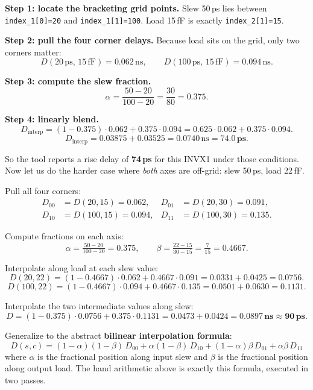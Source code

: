 \textbf{Step 1: locate the bracketing grid points.} Slew 50\,ps lies between \texttt{index\_1[0]=20} and \texttt{index\_1[1]=100}. Load 15\,fF is exactly \texttt{index\_2[1]=15}.

\textbf{Step 2: pull the four corner delays.} Because load sits on the grid, only two corners matter:
\[
D(20\,\text{ps},\,15\,\text{fF}) = 0.062\,\text{ns}, \qquad D(100\,\text{ps},\,15\,\text{fF}) = 0.094\,\text{ns}.
\]

\textbf{Step 3: compute the slew fraction.}
\[
\alpha = \frac{50 - 20}{100 - 20} = \frac{30}{80} = 0.375.
\]

\textbf{Step 4: linearly blend.}
\[
D_{\text{interp}} = (1 - 0.375)\cdot 0.062 + 0.375 \cdot 0.094 = 0.625 \cdot 0.062 + 0.375 \cdot 0.094.
\]
\[
D_{\text{interp}} = 0.03875 + 0.03525 = 0.0740\,\text{ns} = \mathbf{74.0\,ps}.
\]

So the tool reports a rise delay of \textbf{74\,ps} for this INVX1 under those conditions. Now let us do the harder case where \emph{both} axes are off-grid: slew 50\,ps, load 22\,fF.

 Pull all four corners:
\[
\begin{aligned}
D_{00} &= D(20, 15) = 0.062, & D_{01} &= D(20, 30) = 0.091,\\
D_{10} &= D(100, 15) = 0.094, & D_{11} &= D(100, 30) = 0.135.
\end{aligned}
\]

 Compute fractions on each axis:
\[
\alpha = \tfrac{50-20}{100-20} = 0.375, \qquad \beta = \tfrac{22-15}{30-15} = \tfrac{7}{15} = 0.4667.
\]

 Interpolate along load at each slew value:
\[
D(20, 22) = (1-0.4667)\cdot 0.062 + 0.4667 \cdot 0.091 = 0.0331 + 0.0425 = 0.0756.
\]
\[
D(100, 22) = (1-0.4667)\cdot 0.094 + 0.4667 \cdot 0.135 = 0.0501 + 0.0630 = 0.1131.
\]

 Interpolate the two intermediate values along slew:
\[
D = (1-0.375)\cdot 0.0756 + 0.375 \cdot 0.1131 = 0.0473 + 0.0424 = \mathbf{0.0897\,\text{ns}} \approx \mathbf{90\,ps}.
\]

 Generalize to the abstract \textbf{bilinear interpolation formula}:
\[
D(s, c) = (1-\alpha)(1-\beta)\,D_{00} + \alpha(1-\beta)\,D_{10} + (1-\alpha)\beta\,D_{01} + \alpha\beta\,D_{11}
\]
where \(\alpha\) is the fractional position along input slew and \(\beta\) is the fractional position along output load. The hand arithmetic above is exactly this formula, executed in two passes.

